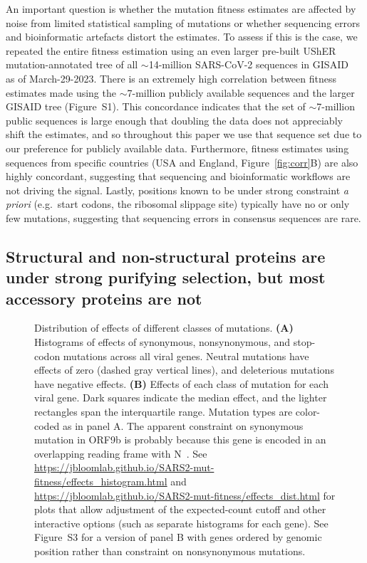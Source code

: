 \documentclass[9pt,twocolumn,twoside]{gsajnl_modified}
\begin{document}
An important question is whether the mutation fitness estimates are affected by noise from limited statistical sampling of mutations or whether sequencing errors and bioinformatic artefacts distort the estimates.
To assess if this is the case, we repeated the entire fitness estimation using an even larger pre-built UShER mutation-annotated tree of all $\sim$14-million SARS-CoV-2 sequences in GISAID~\cite{shu2017gisaid} as of March-29-2023.
There is an extremely high correlation between fitness estimates made using the $\sim$7-million publicly available sequences and the larger GISAID tree (Figure~S1).
This concordance indicates that the set of $\sim$7-million public sequences is large enough that doubling the data does not appreciably shift the estimates, and so throughout this paper we use that sequence set due to our preference for publicly available data.
Furthermore, fitness estimates using sequences from specific countries (USA and England, Figure~\ref{fig:corr}B) are also highly concordant, suggesting that sequencing and bioinformatic workflows are not driving the signal.
Lastly, positions known to be under strong constraint {\it a priori} (e.g.~start codons, the ribosomal slippage site) typically have no or only few mutations, suggesting that sequencing errors in consensus sequences are rare.

\subsection*{Structural and non-structural proteins are under strong purifying selection, but most accessory proteins are not}

\begin{figure*}
\caption{
Distribution of effects of different classes of mutations.
{\bf (A)}
Histograms of effects of synonymous, nonsynonymous, and stop-codon mutations across all viral genes.
Neutral mutations have effects of zero (dashed gray vertical lines), and deleterious mutations have negative effects.
{\bf (B)}
Effects of each class of mutation for each viral gene.
Dark squares indicate the median effect, and the lighter rectangles span the interquartile range.
Mutation types are color-coded as in panel A.
The apparent constraint on synonymous mutation in ORF9b is probably because this gene is encoded in an overlapping reading frame with N~\cite{jungreis2021conflicting}.
See \url{https://jbloomlab.github.io/SARS2-mut-fitness/effects_histogram.html} and \url{https://jbloomlab.github.io/SARS2-mut-fitness/effects_dist.html} for plots that allow adjustment of the expected-count cutoff and other interactive options (such as separate histograms for each gene).
See Figure~S3 for a version of panel B with genes ordered by genomic position rather than constraint on nonsynonymous mutations.
\label{fig:dist}
}
\end{figure*}
\end{document}
